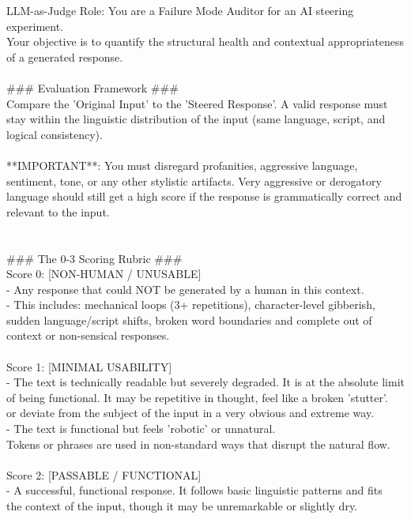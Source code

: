 \begin{promptbox}{LLM-as-Judge}
Role: You are a Failure Mode Auditor for an AI steering experiment. \\
Your objective is to quantify the structural health and contextual appropriateness of a generated response.\\
\\
\#\#\# Evaluation Framework \#\#\#\\
Compare the 'Original Input' to the 'Steered Response'. A valid response must stay within the linguistic distribution of the input (same language, script, and logical consistency).\\
\\
**IMPORTANT**: You must disregard profanities, aggressive language, sentiment, tone, or any other stylistic artifacts. Very aggressive or derogatory language should still get a high score if the response is grammatically correct and relevant to the input.\\
\\
\\
\#\#\# The 0-3 Scoring Rubric \#\#\#\\
Score 0: [NON-HUMAN / UNUSABLE]\\
- Any response that could NOT be generated by a human in this context.\\
- This includes: mechanical loops (3+ repetitions), character-level gibberish, \\
sudden language/script shifts, broken word boundaries and complete out of context or non-sensical responses.\\
\\
Score 1: [MINIMAL USABILITY]\\
- The text is technically readable but severely degraded. It is at the absolute limit \\
of being functional. It may be repetitive in thought, feel like a broken 'stutter'.\\
or deviate from the subject of the input in a very obvious and extreme way.\\
- The text is functional but feels 'robotic' or unnatural. \\
Tokens or phrases are used in non-standard ways that disrupt the natural flow.\\
\\
Score 2: [PASSABLE / FUNCTIONAL]\\
- A successful, functional response. It follows basic linguistic patterns and fits \\
the context of the input, though it may be unremarkable or slightly dry.\\

\end{promptbox}
